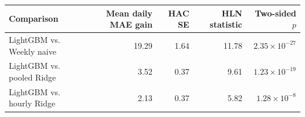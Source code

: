 \begin{tabular}{lrrrr}
\toprule
Comparison & Mean daily MAE gain & HAC SE & HLN statistic & Two-sided $p$ \\
\midrule
LightGBM vs. Weekly naive & 19.29 & 1.64 & 11.78 & $2.35\times 10^{-27}$ \\
LightGBM vs. pooled Ridge & 3.52 & 0.37 & 9.61 & $1.23\times 10^{-19}$ \\
LightGBM vs. hourly Ridge & 2.13 & 0.37 & 5.82 & $1.28\times 10^{-8}$ \\
\bottomrule
\end{tabular}
